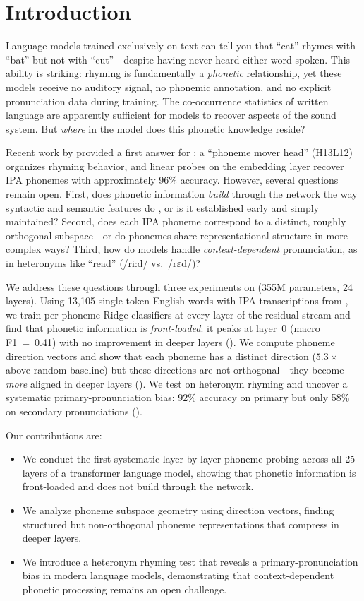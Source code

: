 \section{Introduction}
\label{sec:intro}

Language models trained exclusively on text can tell you that ``cat'' rhymes with ``bat'' but not with ``cut''---despite having never heard either word spoken.
This ability is striking: rhyming is fundamentally a \emph{phonetic} relationship, yet these models receive no auditory signal, no phonemic annotation, and no explicit pronunciation data during training.
The co-occurrence statistics of written language are apparently sufficient for models to recover aspects of the sound system.
But \emph{where} in the model does this phonetic knowledge reside?

Recent work by \citet{mclaughlin2025rhyme} provided a first answer for \llama: a ``phoneme mover head'' (H13L12) organizes rhyming behavior, and linear probes on the embedding layer recover IPA phonemes with approximately 96\% accuracy.
However, several questions remain open.
First, does phonetic information \emph{build} through the network the way syntactic and semantic features do \citep{radford2019language}, or is it established early and simply maintained?
Second, does each IPA phoneme correspond to a distinct, roughly orthogonal subspace---or do phonemes share representational structure in more complex ways?
Third, how do models handle \emph{context-dependent} pronunciation, as in heteronyms like ``read'' (/ri:d/ vs.\ /r$\varepsilon$d/)?

We address these questions through three experiments on \gptmed (355M parameters, 24 layers).
Using 13{,}105 single-token English words with IPA transcriptions from \wikipron, we train per-phoneme Ridge classifiers at every layer of the residual stream and find that phonetic information is \emph{front-loaded}: it peaks at layer~0 (macro F1~=~0.41) with no improvement in deeper layers ().
We compute phoneme direction vectors and show that each phoneme has a distinct direction ($5.3\times$ above random baseline) but these directions are not orthogonal---they become \emph{more} aligned in deeper layers ().
We test \gptfour on heteronym rhyming and uncover a systematic primary-pronunciation bias: 92\% accuracy on primary but only 58\% on secondary pronunciations ().

Our contributions are:
\begin{itemize}[leftmargin=*,itemsep=0pt,topsep=0pt]
    \item We conduct the first systematic layer-by-layer phoneme probing across all 25 layers of a transformer language model, showing that phonetic information is front-loaded and does not build through the network.
    \item We analyze phoneme subspace geometry using direction vectors, finding structured but non-orthogonal phoneme representations that compress in deeper layers.
    \item We introduce a heteronym rhyming test that reveals a primary-pronunciation bias in modern language models, demonstrating that context-dependent phonetic processing remains an open challenge.
\end{itemize}
